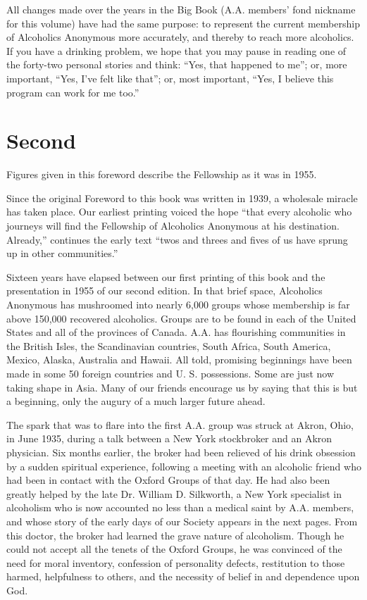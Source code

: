 All changes made over the years in the Big Book (A.A. members’ fond nickname for this volume) have had the same purpose: 
to represent the current membership of Alcoholics Anonymous more accurately, and thereby to reach more alcoholics.
If you have a drinking problem, we hope that you may pause in reading one of the forty-two personal stories and think: 
“Yes, that happened to me”; 
or, more important, “Yes, I’ve felt like that”; 
or, most important, “Yes, I believe this program can work for me too.”



\section{Second}

Figures given in this foreword describe the
Fellowship as it was in 1955.

Since the original Foreword to this book was written in 1939, a wholesale miracle has taken place. 
Our earliest printing voiced the hope “that every alcoholic who journeys will find the Fellowship of Alcoholics Anonymous at his destination. Already,”
continues the early text “twos and threes and fives of us have sprung up in other communities.”

Sixteen years have elapsed between our first printing of this book and the presentation in 1955 of our second edition.
In that brief space, Alcoholics Anonymous has mushroomed into nearly 6,000 groups whose membership is far above 150,000 recovered alcoholics.
Groups are to be found in each of the United States and all of the provinces of Canada.
A.A. has flourishing communities in the British Isles, the Scandinavian countries, South Africa, South America, Mexico, Alaska, Australia and Hawaii. 
All told, promising beginnings have been made in some 50 foreign countries and U. S. possessions. 
Some are just now taking shape in Asia. 
Many of our friends encourage us by saying that this is but a beginning, only the augury of a much larger future ahead.

The spark that was to ﬂare into the ﬁrst A.A. group was struck at Akron, Ohio, in June 1935, during a talk between a New York stockbroker and an Akron physician. 
Six months earlier, the broker had been relieved of his drink obsession by a sudden spiritual
experience, following a meeting with an alcoholic friend who had been in contact with the Oxford Groups of that day. 
He had also been greatly helped by the late Dr. William D. Silkworth, a New York specialist in alcoholism who is now accounted no less than a medical saint by A.A. members, and whose story of the early days of our Society appears in the next pages. 
From this doctor, the broker had learned the grave nature of alcoholism. 
Though he could not accept all the tenets of the Oxford Groups, he was convinced of the need for moral inventory, confession of personality defects, restitution to those harmed, helpfulness to others, and the necessity of belief in and dependence upon God.

